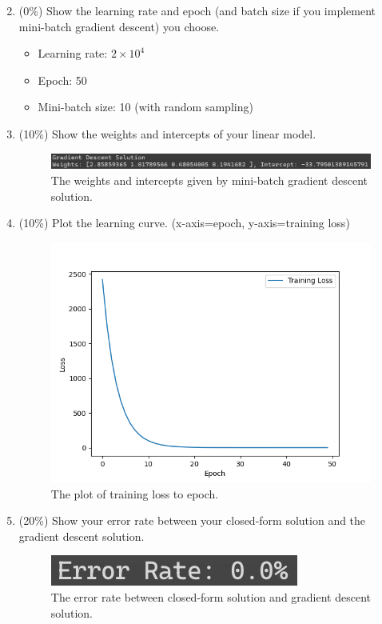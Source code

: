 \documentclass[twocolumn]{extarticle}
\begin{document}
\begin{enumerate}
\setcounter{enumi}{1}
\item (0\%)   Show the learning rate and epoch (and batch size if you implement mini-batch gradient descent) you choose.
\begin{itemize}
	\item Learning rate: $2 \times 10^4$
	\item Epoch: 50
	\item Mini-batch size: 10 (with random sampling)
\end{itemize}
\item (10\%) Show the weights and intercepts of your linear model.
\begin{figure}[H]
\centering
\includegraphics[width=\linewidth]{gradient_weights}
\caption{The weights and intercepts given by mini-batch gradient descent solution.}
\label{fig:gradientweights}
\end{figure}


\item (10\%) Plot the learning curve. (x-axis=epoch, y-axis=training loss)
\begin{figure}[H]
\centering
\includegraphics[width=\linewidth]{lr_plot}
\caption{The plot of training loss to epoch.}
\label{fig:lrplot}
\end{figure}

\item (20\%) Show your error rate between your closed-form solution and the gradient descent solution.
\begin{figure}[H]
\centering
\includegraphics[width=0.5\linewidth]{error_rate}
\caption{The error rate between closed-form solution and gradient descent solution.}
\label{fig:errorrate}
\end{figure}
\end{enumerate}
\end{document}
